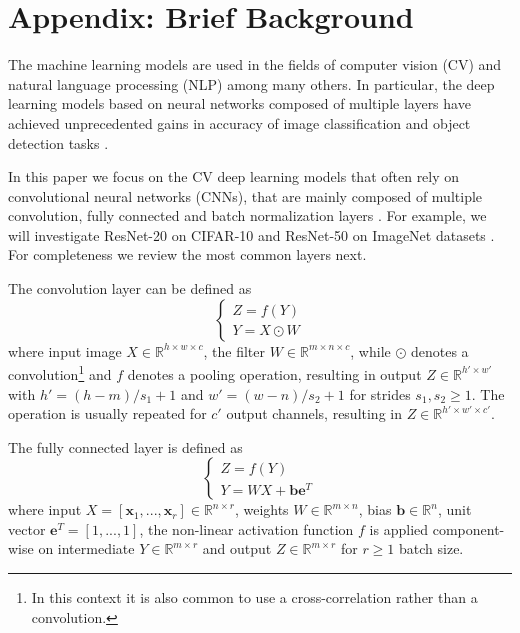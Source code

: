 \documentclass{article}
\begin{document}
\section{Appendix: Brief Background}

The machine learning models are used in the fields of computer vision (CV) and natural language processing (NLP) among many others. In particular, the deep learning models based on neural networks composed of multiple layers have achieved unprecedented gains in accuracy of image classification and object detection tasks \cite{Krizhevsky2012,Szegedy2014,MNIST,CIFAR,ImageNet}.

In this paper we focus on the CV deep learning models that often rely on convolutional neural networks (CNNs), that are mainly composed of multiple convolution, fully connected and batch normalization layers \cite{LeNet1989a,LeNet1989d,Goodfellow2016,Ioffe2015}. For example, we will investigate ResNet-20 on CIFAR-10 and ResNet-50 on ImageNet datasets \cite{ResNet,CIFAR,ImageNet}. For completeness we review the most common layers next.

The convolution layer can be defined as
\begin{equation}
\left\{
\begin{array}{l}
Z = f(Y) \\
Y = X \odot W
\end{array}
\right.
\label{eq:convolution}
\end{equation}
where input image $X \in \mathbb{R}^{h \times w \times c}$, the filter $W \in \mathbb{R}^{m \times n \times c}$, while $\odot$ denotes a convolution\footnote{In this context it is also common to use a cross-correlation rather than a convolution.} and $f$ denotes a pooling operation, resulting in output $Z \in \mathbb{R}^{h' \times w'}$ with $h'=(h-m)/s_1+1$ and $w'=(w-n)/s_2+1$ for strides $s_1,s_2 \ge 1$. The operation is usually repeated for $c'$ output channels, resulting in $Z \in \mathbb{R}^{h' \times w' \times c'}$.

The fully connected layer is defined as
\begin{equation}
\left\{
\begin{array}{l}
Z = f(Y) \\
Y = WX + \textbf{b}\textbf{e}^{T}
\end{array}
\right.
\label{eq:fully_connected}
\end{equation}
where input $X = [\textbf{x}_1,...,\textbf{x}_r] \in \mathbb{R}^{n \times r}$, weights $W \in \mathbb{R}^{m \times n}$, bias $\textbf{b} \in \mathbb{R}^n$, unit vector $\textbf{e}^{T}=[1,...,1]$, the non-linear activation function $f$ is applied component-wise on intermediate $Y \in \mathbb{R}^{m \times r}$ and output $Z\in \mathbb{R}^{m \times r}$ for $r \ge 1$ batch size.
\end{document}
